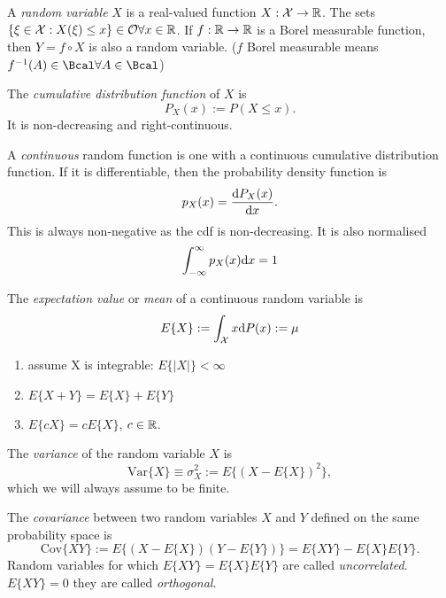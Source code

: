 A \textit{random variable} $X$ is a real-valued function $X:\mathcal{X} \rightarrow \mathbb{R}$. The sets $\{ \xi \in \mathcal{X} : X(\xi) \leq x \} \in \mathcal{O} \forall x \in \mathbb{R}$. If $f:\mathbb{R} \rightarrow \mathbb{R}$ is a Borel measurable function, then $Y=f \circ X$ is also a random variable. ($f$ Borel measurable means $f^{-1}(A)\in\Bcal \forall A \in \Bcal$)

The \textit{cumulative distribution function} of $X$ is 
\begin{equation}
\label{eq:cdf}
P_X(x) := P(X\leq x).
\end{equation} 
It is non-decreasing and right-continuous.

A \textit{continuous} random function is one with a continuous cumulative distribution function. If it is differentiable, then the probability density  function is 
\begin{equation}
\label{eq:pdf}
p_X(x)=\frac{{\mbox{d}} P_X(x)}{{\mbox{d}} x}.
\end{equation}
This is always non-negative as the cdf is non-decreasing. It is also normalised 
\begin{equation}
\label{eq:pdfNormalised}
\int_{-\infty}^{\infty} p_X(x) {\mbox{d}} x =1
\end{equation}

The \textit{expectation value} or \textit{mean} of a continuous random variable is 
\begin{equation}
\label{eq:expectation}
E\{X\} := \int_{\mathcal{X}} x {\mbox{d}} P(x) :=\mu
\end{equation}
\begin{enumerate}
 \item assume X is integrable: $E\{|X|\} < \infty$
 \item $E\{ X+Y \} = E\{X\} + E\{Y\}$
 \item $E\{cX\}=cE\{X\}$, $c\in \mathbb{R}$.
\end{enumerate}

The \textit{variance} of the random variable $X$ is 
\begin{equation}
\mbox{Var} \{ X \} \equiv \sigma^2_X := E\{(X-E\{X\})^2\},
\end{equation}
which we will always assume to be finite.

The \textit{covariance} between two random variables $X$ and $Y$ defined on the same probability space is 
\begin{equation}
\mbox{Cov}\{XY\} := E\{(X-E\{X\})(Y-E\{Y\})\} = E\{XY\}-E\{X\}E\{Y\}.
\end{equation}
Random variables for which $E\{XY\}=E\{X\}E\{Y\}$ are called \textit{uncorrelated}. $E\{XY\}=0$ they are called \textit{orthogonal}.

